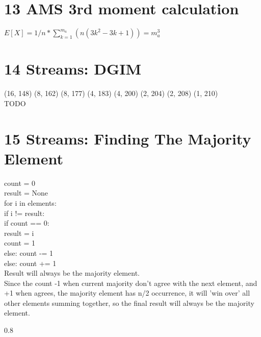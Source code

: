 \documentclass{article}
\newenvironment{myenv}[1]
  {\begin{spacing}{#1}}
  {\end{spacing}}
\begin{document}
\section{13 AMS 3rd moment calculation}
$E[X] = 1/n * \sum\limits_{k=1}^{m_a} (n(3k^2-3k+1)) = m_a^3$

\section{14 Streams: DGIM}
(16, 148) (8, 162) (8, 177) (4, 183) (4, 200) (2, 204) (2, 208) (1, 210) \\
TODO

\section{15 Streams: Finding The Majority Element }
count = 0\\
result = None \\
for i in elements: \\
\indent if i != result: \\
\indent \indent if count == 0: \\
\indent \indent \indent result = i \\
\indent \indent \indent count = 1 \\
\indent \indent else: count -= 1 \\
\indent else: count += 1 \\

Result will always be the majority element. \\
Since the count -1 when current majority don't agree with the next element, and +1 when agrees, the majority element has n/2 occurrence, it will 'win over' all other elements summing together, so the final result will always be the majority element.

\begin{myenv}{0.8}
\begin{verbatim}
\end{verbatim}
\end{myenv}
\end{document}

